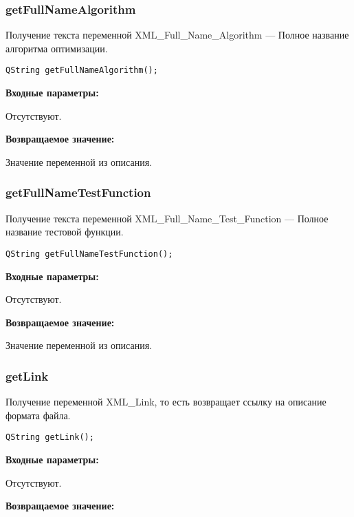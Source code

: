 \documentclass[a4paper,12pt]{article}
\begin{document}
\subsubsection{getFullNameAlgorithm}\label{getFullNameAlgorithm}

Получение текста переменной  XML\_Full\_Name\_Algorithm --- Полное название алгоритма оптимизации.


\begin{lstlisting}[label=code_syntax_getFullNameAlgorithm,caption=Синтаксис]
QString getFullNameAlgorithm();
\end{lstlisting}

\textbf{Входные параметры:}

Отсутствуют.

\textbf{Возвращаемое значение:}

Значение переменной из описания.


\subsubsection{getFullNameTestFunction}\label{getFullNameTestFunction}

Получение текста переменной  XML\_Full\_Name\_Test\_Function --- Полное название тестовой функции.


\begin{lstlisting}[label=code_syntax_getFullNameTestFunction,caption=Синтаксис]
QString getFullNameTestFunction();
\end{lstlisting}

\textbf{Входные параметры:}

Отсутствуют.

\textbf{Возвращаемое значение:}

Значение переменной из описания.


\subsubsection{getLink}\label{getLink}

Получение переменной XML\_Link, то есть возвращает ссылку на описание формата файла.


\begin{lstlisting}[label=code_syntax_getLink,caption=Синтаксис]
QString getLink();
\end{lstlisting}

\textbf{Входные параметры:}

Отсутствуют.

\textbf{Возвращаемое значение:}
\end{document}
